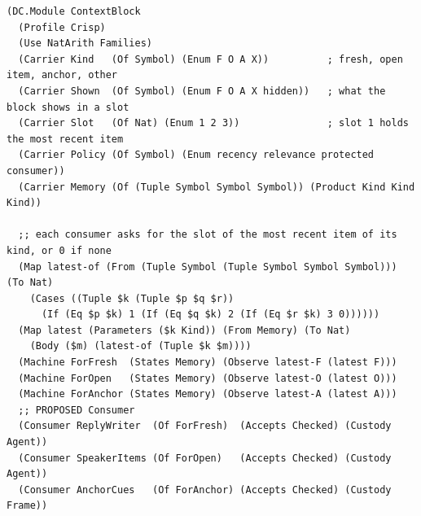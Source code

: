 \documentclass[11pt]{article}
\theoremstyle{definition}
\theoremstyle{plain}
\begin{document}
\begin{lstlisting}[style=mettamod]
(DC.Module ContextBlock
  (Profile Crisp)
  (Use NatArith Families)
  (Carrier Kind   (Of Symbol) (Enum F O A X))          ; fresh, open item, anchor, other
  (Carrier Shown  (Of Symbol) (Enum F O A X hidden))   ; what the block shows in a slot
  (Carrier Slot   (Of Nat) (Enum 1 2 3))               ; slot 1 holds the most recent item
  (Carrier Policy (Of Symbol) (Enum recency relevance protected consumer))
  (Carrier Memory (Of (Tuple Symbol Symbol Symbol)) (Product Kind Kind Kind))

  ;; each consumer asks for the slot of the most recent item of its kind, or 0 if none
  (Map latest-of (From (Tuple Symbol (Tuple Symbol Symbol Symbol))) (To Nat)
    (Cases ((Tuple $k (Tuple $p $q $r))
      (If (Eq $p $k) 1 (If (Eq $q $k) 2 (If (Eq $r $k) 3 0))))))
  (Map latest (Parameters ($k Kind)) (From Memory) (To Nat)
    (Body ($m) (latest-of (Tuple $k $m))))
  (Machine ForFresh  (States Memory) (Observe latest-F (latest F)))
  (Machine ForOpen   (States Memory) (Observe latest-O (latest O)))
  (Machine ForAnchor (States Memory) (Observe latest-A (latest A)))
  ;; PROPOSED Consumer
  (Consumer ReplyWriter  (Of ForFresh)  (Accepts Checked) (Custody Agent))
  (Consumer SpeakerItems (Of ForOpen)   (Accepts Checked) (Custody Agent))
  (Consumer AnchorCues   (Of ForAnchor) (Accepts Checked) (Custody Frame))


\end{lstlisting}
\end{document}
